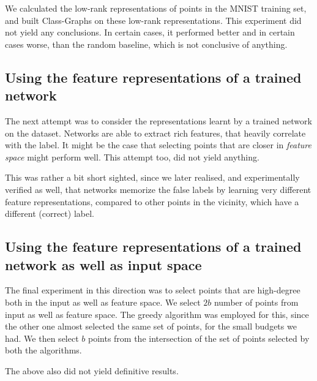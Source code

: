 \documentclass{ociamthesis}
\begin{document}
We calculated the low-rank representations of points in the MNIST training set,
and built Class-Graphs on these low-rank representations. This experiment did
not yield any conclusions. In certain cases, it performed better and in certain
cases worse, than the random baseline, which is not conclusive of anything.

\subsection{Using the feature representations of a trained network}
The next attempt was to consider the representations learnt by a trained network
on the dataset. Networks are able to extract rich features, that heavily
correlate with the label. It might be the case that selecting points that are
closer in \emph{feature space} might perform well. This attempt too, did not
yield anything.

This was rather a bit short sighted, since we later realised, and experimentally
verified as well, that networks memorize the false labels by learning very
different feature representations, compared to other points in the vicinity,
which have a different (correct) label.


\subsection{Using the feature representations of a trained network as well as input space}

The final experiment in this direction was to select points that are high-degree
both in the input as well as feature space. We select $2b$ number of points from
input as well as feature space. The greedy algorithm was employed for this,
since the other one almost selected the same set of points, for the small
budgets we had. We then select $b$ points from the intersection of the set of
points selected by both the algorithms.

The above also did not yield definitive results.
\end{document}
